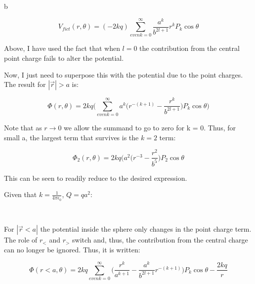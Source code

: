 \begin{homeworkProblem}[Jackson 3rd ed. : 3.7]
\begin{homeworkSection}{b}
\begin{center}
\[
V_{fict}(r,\theta) = (-2kq) \sum\limits_{even k=0}^\infty \frac{a^k}{b^{2l+1}} r^{k} P_k\cos\theta
\]
\end{center}

Above, I have used the fact that when $l=0$ the contribution from the central point charge fails to alter the potential.

Now, I just need to superpose this with the potential due to the point charges. The result for $|\vec{r}|>a$ is:

\[
\Phi(r,\theta) = 2kq \bigg( \sum\limits_{even k=0}^\infty a^k \Big(r^{-(k+1)}-\frac{r^k}{b^{2l+1}}\Big) P_k\cos\theta \bigg)
\]

Note that as $r \rightarrow 0$ we allow the summand to go to zero for k = 0. Thus, for small a, the largest term that survives is the $k=2$ term:

\[
\Phi_2(r,\theta) = 2kq\bigg( a^2(r^{-3} - \frac{r^2}{b^5} \bigg)P_2\cos\theta
\]

This can be seen to readily reduce to the desired expression. 

Given that $k = \frac{1}{4\pi\epsilon_0}$, $Q = qa^2$: \\ \par
\problemAnswer{
\[ \Phi_2(r,\theta) = \frac{Q}{2\pi\epsilon_0 r^3}\bigg(1 - \frac{r^5}{b^5} \bigg)P_2\cos\theta \]
}
\\ \par
For $|\vec{r}<a|$ the potential inside the sphere only changes in the point charge term. The role of $r_<$ and $r_>$ switch and, thus, the contribution from the central charge can no longer be ignored. Thus, it is written:

\[
\Phi(r<a,\theta) = 2kq \sum\limits_{even k = 0}^{\infty} \bigg( \frac{r^k}{a^{k+1}} - \frac{a^k}{b^{2l+1}}r^{-(k+1)}\bigg) P_k\cos\theta - \frac{2kq}{r}
\]
\end{homeworkSection}

\end{homeworkProblem}